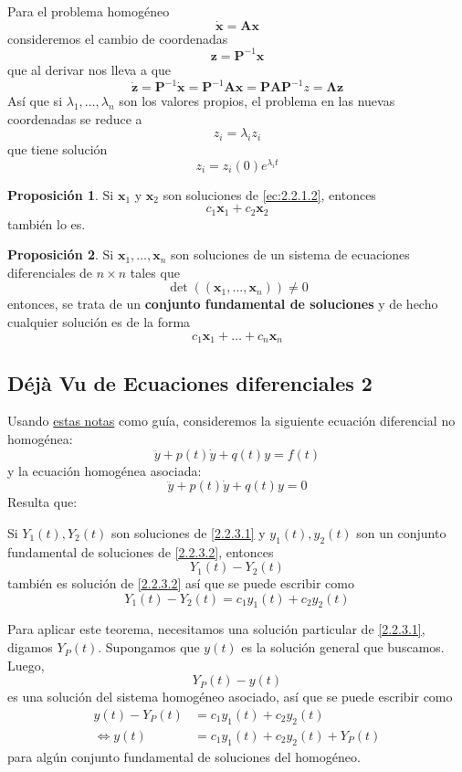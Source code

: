 \documentclass[spanish]{book}
\theoremstyle{definition}
\newtheorem*{prop}{Proposición}
\begin{document}
	Para el problema homogéneo
		\begin{equation}\label{ec:2.2.1.2}
		\dot{\mathbf{x}}=\mathbf{A}\mathbf{x}
	\end{equation}
	consideremos el cambio de coordenadas
	\[\mathbf{z}=\mathbf{P}^{-1}\mathbf{x}\]
	que al derivar nos lleva a que
	\[\dot{\mathbf{z}}=\mathbf{P}^{-1}\dot{\mathbf{x}}=\mathbf{P}^{-1}\mathbf{A}\mathbf{x}=\mathbf{PAP}^{-1}z=\mathbf{\Lambda z}\]
	Así que si $\lambda_1,\ldots,\lambda_n$ son los valores propios, el problema en las nuevas coordenadas se reduce a
	\[z_i=\lambda_i z_i\]
	que tiene solución
	\[z_i=z_i(0)e^{\lambda_it}\]
	
	\begin{prop}\label{prop:2.2.2.1.1}
		Si $\mathbf{x}_1$ y $\mathbf{x}_2$ son soluciones de \eqref{ec:2.2.1.2}, entonces
		\[c_1\mathbf{x}_1+c_2\mathbf{x}_2\]
		también lo es.
	\end{prop}
	\begin{prop}
		Si $\mathbf{x}_1,\ldots,\mathbf{x}_n$ son soluciones de un sistema de ecuaciones diferenciales de $n\times n$ tales que
		\[\det((\mathbf{x}_1,\ldots,\mathbf{x}_n))\neq0\]
		entonces, se trata de un \textbf{conjunto fundamental de soluciones} y de hecho cualquier solución es de la forma
		\[c_1\mathbf{x}_1+\ldots+c_n\mathbf{x}_n\]
	\end{prop}
\newpage

\subsection{Déjà Vu de Ecuaciones diferenciales 2}
Usando \href{https://tutorial.math.lamar.edu/Classes/DE/NonhomogeneousDE.aspx#mjx-eqn-eqeq1}{estas notas} como guía, consideremos la siguiente ecuación diferencial no homogénea:
\begin{equation}\label{2.2.3.1}
	\ddot{y}+p(t)\dot{y}+q(t)y=f(t)
\end{equation}
y la ecuación homogénea asociada:
\begin{equation}\label{2.2.3.2}
	\ddot{y}+p(t)\dot{y}+q(t)y=0
\end{equation}
Resulta que:
\begin{teo}
	Si $Y_1(t), Y_2(t)$ son soluciones de \eqref{2.2.3.1} y $y_1(t),y_2(t)$ son un conjunto fundamental de soluciones de \eqref{2.2.3.2}, entonces
	\[Y_1(t)-Y_2(t)\]
	también es solución de \eqref{2.2.3.2} así que se puede escribir como
	\[Y_1(t)-Y_2(t)=c_1y_1(t)+c_2y_2(t)\]
\end{teo}
	Para aplicar este teorema, necesitamos una solución particular de \eqref{2.2.3.1}, digamos $Y_P(t)$. Supongamos que $y(t)$ es la solución general que buscamos. Luego,
	\[Y_P(t)-y(t)\]
	es una solución del sistema homogéneo asociado, así que se puede escribir como 
	\begin{align*}
		y(t)-Y_P(t)&=c_1y_1(t)+c_2y_2(t)\\
	\iff y(t)&=c_1y_1(t)+c_2y_2(t)+Y_P(t)
	\end{align*}
	para algún conjunto fundamental de soluciones del homogéneo.
\fi
\end{document}
